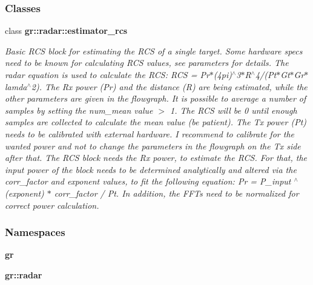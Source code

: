\subsubsection*{Classes}
\begin{DoxyCompactItemize}
\item 
class {\bf gr\+::radar\+::estimator\+\_\+rcs}
\begin{DoxyCompactList}\small\item\em Basic R\+CS block for estimating the R\+CS of a single target. Some hardware specs need to be known for calculating R\+CS values, see parameters for details. The radar equation is used to calculate the R\+CS\+: R\+CS = Pr$\ast$(4pi)$^\wedge$3$\ast$\+R$^\wedge$4/(Pt$\ast$\+Gt$\ast$\+Gr$\ast$lamda$^\wedge$2). The Rx power (Pr) and the distance (R) are being estimated, while the other parameters are given in the flowgraph. It is possible to average a number of samples by setting the num\+\_\+mean value $>$ 1. The R\+CS will be 0 until enough samples are collected to calculate the mean value (be patient). The Tx power (Pt) needs to be calibrated with external hardware. I recommend to calibrate for the wanted power and not to change the parameters in the flowgraph on the Tx side after that. The R\+CS block needs the Rx power, to estimate the R\+CS. For that, the input power of the block needs to be determined analytically and altered via the corr\+\_\+factor and exponent values, to fit the following equation\+: Pr = P\+\_\+input $^\wedge$ (exponent) $\ast$ corr\+\_\+factor / Pt. In addition, the F\+F\+Ts need to be normalized for correct power calculation. \end{DoxyCompactList}\end{DoxyCompactItemize}
\subsubsection*{Namespaces}
\begin{DoxyCompactItemize}
\item 
 {\bf gr}
\item 
 {\bf gr\+::radar}
\end{DoxyCompactItemize}

